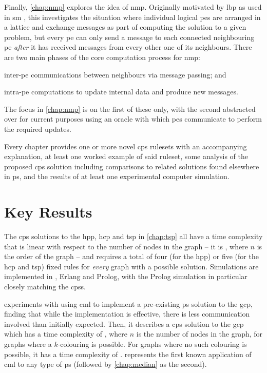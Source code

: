 Finally, \cref{chap:nmp} explores the idea of \gls{nmp}.  Originally motivated by \gls{lbp} \cite{Sun2003,Felzenszwalb2006,Felzenszwalb2011} as used in \gls{sm} \cite{Sinha2020,Tippetts2016,Scharstein2002}, this  investigates the situation where individual logical \glspl{pe} are arranged in a lattice and exchange messages as part of computing the solution to a given problem, but every \gls{pe} can only send a message to each connected neighbouring \gls{pe} \emph{after} it has received messages from every other one of its neighbours.  There are two main phases of the core computation process for \gls{nmp}:
\begin{inparaenum}[a)]
\item inter-\gls{pe} communications between neighbours via message passing; and
\item intra-\gls{pe} computations to update internal data and produce new messages.
\end{inparaenum}  The focus in \cref{chap:nmp} is on the first of these only, with the second abstracted over for current purposes using an oracle with which \glspl{pe} communicate to perform the required updates.

Every chapter provides one or more novel \gls{cps} \glspl{ruleset} with an accompanying explanation, at least one worked example of said \gls{ruleset}, some analysis of the proposed \gls{cps} solution including comparisons to related solutions found elsewhere in \gls{ps}, and the results of at least one experimental computer simulation.

\section{Key Results}

The \gls{cps} solutions to the \gls{hpp}, \gls{hcp} and \gls{tsp} in \cref{chap:tsp} all have a time complexity that is linear with respect to the number of nodes in the graph -- \ie{} it is , where \(n\) is the order of the graph -- and requires a total of four (for the \gls{hpp}) or five (for the \gls{hcp} and \gls{tsp}) fixed rules for \emph{every} graph with a possible solution.  Simulations are implemented in \fsharp{}, Erlang and Prolog, with the Prolog simulation in particular closely matching the \glspl{cps}.

 experiments with using \gls{cml} to implement a pre-existing \gls{ps} solution to the \gls{gcp}, finding that while the implementation is effective, there is less communication involved than initially expected.  Then, it describes a \gls{cps} solution to the \gls{gcp} which has a time complexity of , where \(n\) is the number of nodes in the graph, for graphs where a \(k\)-colouring is possible.  For graphs where no such colouring is possible, it has a time complexity of .   represents the first known application of \gls{cml} to any type of \gls{ps} (followed by \cref{chap:median} as the second).

